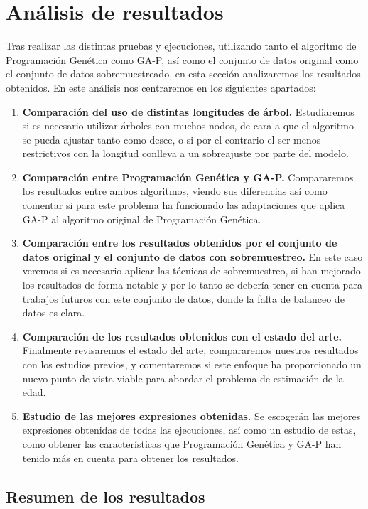 \section{Análisis de resultados}

Tras realizar las distintas pruebas y ejecuciones, utilizando tanto el algoritmo de Programación Genética como GA-P, así como el conjunto de datos original como el conjunto de datos sobremuestreado, en esta sección analizaremos los resultados obtenidos. En este análisis nos centraremos en los siguientes apartados:

\begin{enumerate}
	\item \textbf{Comparación del uso de distintas longitudes de árbol.} Estudiaremos si es necesario utilizar árboles con muchos nodos, de cara a que el algoritmo se pueda ajustar tanto como desee, o si por el contrario el ser menos restrictivos con la longitud conlleva a un sobreajuste por parte del modelo.
	\item \textbf{Comparación entre Programación Genética y GA-P.} Compararemos los resultados entre ambos algoritmos, viendo sus diferencias así como comentar si para este problema ha funcionado las adaptaciones que aplica GA-P al algoritmo original de Programación Genética.
	\item \textbf{Comparación entre los resultados obtenidos por el conjunto de datos original y el conjunto de datos con sobremuestreo.} En este caso veremos si es necesario aplicar las técnicas de sobremuestreo, si han mejorado los resultados de forma notable y por lo tanto se debería tener en cuenta para trabajos futuros con este conjunto de datos, donde la falta de balanceo de datos es clara.
	\item \textbf{Comparación de los resultados obtenidos con el estado del arte.} Finalmente revisaremos el estado del arte, compararemos nuestros resultados con los estudios previos, y comentaremos si este enfoque ha proporcionado un nuevo punto de vista viable para abordar el problema de estimación de la edad.
	\item \textbf{Estudio de las mejores expresiones obtenidas.} Se escogerán las mejores expresiones obtenidas de todas las ejecuciones, así como un estudio de estas, como obtener las características que Programación Genética y GA-P han tenido más en cuenta para obtener los resultados.
\end{enumerate}


\subsection{Resumen de los resultados}

